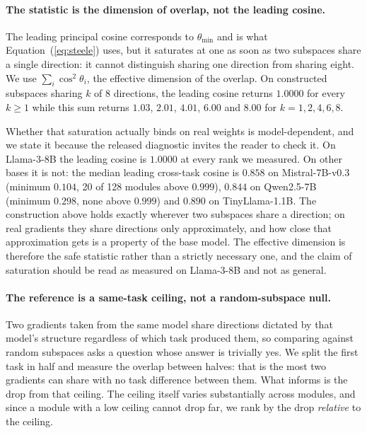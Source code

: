 \documentclass[11pt]{article}
\begin{document}
\paragraph{The statistic is the dimension of overlap, not the leading cosine.}
The leading principal cosine corresponds to $\theta_{\min}$ and is what
Equation~(\ref{eq:steele}) uses, but it saturates at one as soon as two
subspaces share a single direction: it cannot distinguish sharing one direction
from sharing eight. We use $\sum_i \cos^2\theta_i$, the effective dimension of
the overlap. On constructed subspaces sharing $k$ of $8$ directions, the leading
cosine returns $1.0000$ for every $k \geq 1$ while this sum returns $1.03$,
$2.01$, $4.01$, $6.00$ and $8.00$ for $k = 1, 2, 4, 6, 8$.

Whether that saturation actually binds on real weights is model-dependent, and
we state it because the released diagnostic invites the reader to check it. On
Llama-3-8B the leading cosine is $1.0000$ at every rank we measured. On other
bases it is not: the median leading cross-task cosine is $0.858$ on
Mistral-7B-v0.3 (minimum $0.104$, 20 of 128 modules above $0.999$), $0.844$ on
Qwen2.5-7B (minimum $0.298$, none above $0.999$) and $0.890$ on
TinyLlama-1.1B. The construction above holds exactly wherever two subspaces
share a direction; on real gradients they share directions only approximately,
and how close that approximation gets is a property of the base model. The
effective dimension is therefore the safe statistic rather than a strictly
necessary one, and the claim of saturation should be read as measured on
Llama-3-8B and not as general.

\paragraph{The reference is a same-task ceiling, not a random-subspace null.}
Two gradients taken from the same model share directions dictated by that
model's structure regardless of which task produced them, so comparing against
random subspaces asks a question whose answer is trivially yes. We split the
first task in half and measure the overlap between halves: that is the most two
gradients can share with no task difference between them. What informs is the
drop from that ceiling. The ceiling itself varies substantially across modules,
and since a module with a low ceiling cannot drop far, we rank by the drop
\emph{relative} to the ceiling.
\end{document}
